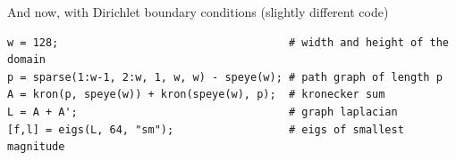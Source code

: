 And now, with Dirichlet boundary conditions (slightly different code)

\begin{verbatim}
w = 128;                                    # width and height of the domain
p = sparse(1:w-1, 2:w, 1, w, w) - speye(w); # path graph of length p
A = kron(p, speye(w)) + kron(speye(w), p);  # kronecker sum
L = A + A';                                 # graph laplacian
[f,l] = eigs(L, 64, "sm");                  # eigs of smallest magnitude
\end{verbatim}


